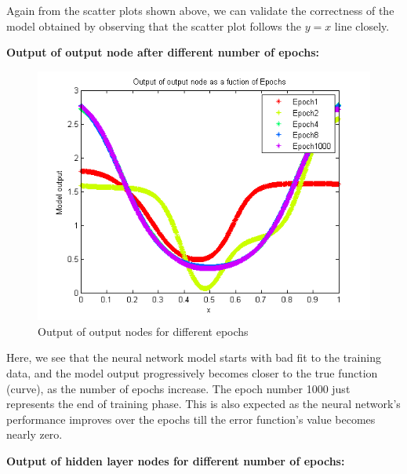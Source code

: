 \documentclass{article}
\begin{document}
\begin{flushleft}
Again from the scatter plots shown above, we can validate the correctness of the model obtained by observing that the scatter plot follows the $y = x$ line closely. 
\end{flushleft}
\newpage

\textbf{Output of output node after different number of epochs:}

\begin{figure}[H]
\centering
\includegraphics[width=0.6\linewidth]{Regression/univariate/epoch_output.png}
\caption{Output of output nodes for different epochs}
\end{figure}

\begin{flushleft}

Here, we see that the neural network model starts with bad fit to the training data, and the model output progressively becomes closer to the true function (curve), as the number of epochs increase. The epoch number 1000 just represents the end of training phase. This is also expected as the neural network's performance improves over the epochs till the error function's value becomes nearly zero. 
\end{flushleft}

\newpage
\textbf{Output of hidden layer nodes for different number of epochs: \\[10pt]}
\end{document}

